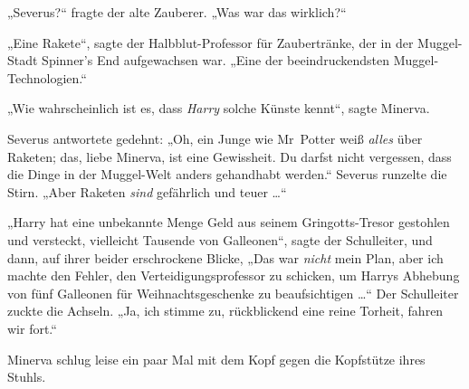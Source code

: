 „Severus?“ fragte der alte Zauberer.
„Was war das wirklich?“

„Eine Rakete“, sagte der Halbblut-Professor für Zaubertränke, der in der Muggel-Stadt Spinner’s End aufgewachsen war.
„Eine der beeindruckendsten Muggel-Technologien.“

„Wie wahrscheinlich ist es, dass \emph{Harry} solche Künste kennt“, sagte Minerva.

Severus antwortete gedehnt:
„Oh, ein Junge wie Mr~Potter weiß \emph{alles} über Raketen; das, liebe Minerva, ist eine Gewissheit. Du darfst nicht vergessen, dass die Dinge in der Muggel-Welt anders gehandhabt werden.“ Severus runzelte die Stirn.
„Aber Raketen \emph{sind} gefährlich und teuer …“

„Harry hat eine unbekannte Menge Geld aus seinem Gringotts-Tresor gestohlen und versteckt, vielleicht Tausende von Galleonen“, sagte der Schulleiter, und dann, auf ihrer beider erschrockene Blicke,
„Das war \emph{nicht} mein Plan, aber ich machte den Fehler, den Verteidigungsprofessor zu schicken, um Harrys Abhebung von fünf Galleonen für Weihnachtsgeschenke zu beaufsichtigen …“ Der Schulleiter zuckte die Achseln.
„Ja, ich stimme zu, rückblickend eine reine Torheit, fahren wir fort.“

Minerva schlug leise ein paar Mal mit dem Kopf gegen die Kopfstütze ihres Stuhls.

